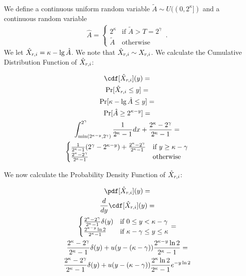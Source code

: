 \begin{gather*}
\end{gather*}

We define a continuous uniform random variable $\tilde A \sim U((0, 2^\kappa])$ and
a continuous random variable
\begin{gather*}
  \hat A =
  \begin{cases}
    2^\kappa & \text{if } \tilde A > T = 2^\gamma \\
    \tilde A & \text{otherwise}
  \end{cases}\,.
\end{gather*}
We let $\hat X_{r, i} = \kappa - \lg \hat A$. We note that $\hat X_{r, i} \sim X_{r, i}$.
We calculate the Cumulative Distribution Function of $\hat X_{r, i}$:

\begin{gather*}
  \cdf[\HX_{r, i}](y) = \\
  \Pr[\HX_{r, i} \leq y] = \\
  \Pr[\kappa - \lg \hat A \leq y] = \\
  \Pr[\hat A \geq 2^{\kappa - y}] = \\
  \int_{\min(2^{\kappa - y}, 2^\gamma)}^{2^\gamma}{\frac{1}{2^\kappa - 1} dx} + \frac{2^\kappa - 2^\gamma}{2^\kappa - 1} = \\
  \begin{cases}
    \frac{1}{2^\kappa - 1}(2^\gamma - 2^{\kappa - y}) + \frac{2^\kappa - 2^\gamma}{2^\kappa - 1} & \text{if } y \geq \kappa - \gamma \\
    \frac{2^\kappa - 2^\gamma}{2^\kappa - 1} & \text{otherwise}
  \end{cases}
\end{gather*}

We now calculate the Probability Density Function of $\hat X_{r, i}$:

\begin{gather*}
  \pdf[\HX_{r, i}](y) = \\
  \frac{d}{dy}\cdf[\HX_{r, i}](y) = \\
  \begin{cases}
    \frac{2^\kappa - 2^\gamma}{2^\kappa - 1} \delta(y) & \text{if } 0 \leq y < \kappa - \gamma \\
    \frac{2^{\kappa - y} \ln 2}{2^\kappa - 1} & \text{if } \kappa - \gamma \leq y \leq \kappa
  \end{cases} = \\
  \frac{2^\kappa - 2^\gamma}{2^\kappa - 1} \delta(y) + u(y - (\kappa - \gamma)) \frac{2^{\kappa - y} \ln 2}{2^\kappa - 1} = \\
  \frac{2^\kappa - 2^\gamma}{2^\kappa - 1} \delta(y) + u(y - (\kappa - \gamma)) \frac{2^{\kappa} \ln 2}{2^\kappa - 1} e^{-y\ln2}
\end{gather*}

